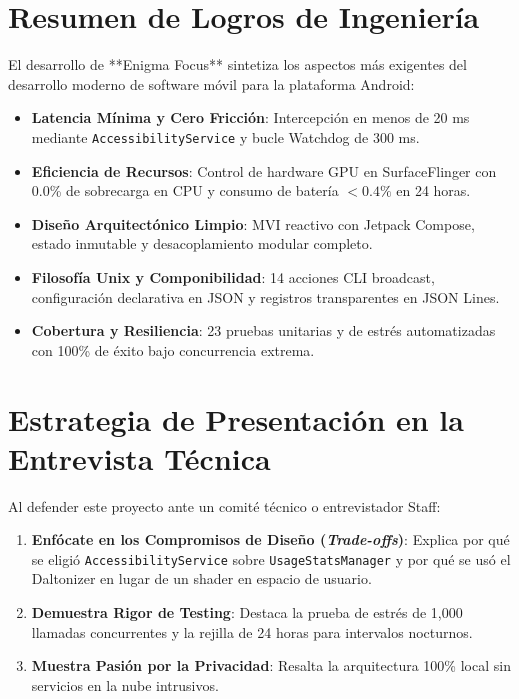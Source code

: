 \documentclass[11pt,a4paper,oneside]{report}
\begin{document}
\section{Resumen de Logros de Ingeniería}
El desarrollo de **Enigma Focus** sintetiza los aspectos más exigentes del desarrollo moderno de software móvil para la plataforma Android:
\begin{itemize}
    \item \textbf{Latencia Mínima y Cero Fricción}: Intercepción en menos de 20 ms mediante \texttt{AccessibilityService} y bucle Watchdog de 300 ms.
    \item \textbf{Eficiencia de Recursos}: Control de hardware GPU en SurfaceFlinger con 0.0\% de sobrecarga en CPU y consumo de batería $<0.4\%$ en 24 horas.
    \item \textbf{Diseño Arquitectónico Limpio}: MVI reactivo con Jetpack Compose, estado inmutable y desacoplamiento modular completo.
    \item \textbf{Filosofía Unix y Componibilidad}: 14 acciones CLI broadcast, configuración declarativa en JSON y registros transparentes en JSON Lines.
    \item \textbf{Cobertura y Resiliencia}: 23 pruebas unitarias y de estrés automatizadas con 100\% de éxito bajo concurrencia extrema.
\end{itemize}

\section{Estrategia de Presentación en la Entrevista Técnica}
Al defender este proyecto ante un comité técnico o entrevistador Staff:
\begin{enumerate}
    \item \textbf{Enfócate en los Compromisos de Diseño (\textit{Trade-offs})}: Explica por qué se eligió \texttt{AccessibilityService} sobre \texttt{UsageStatsManager} y por qué se usó el Daltonizer en lugar de un shader en espacio de usuario.
    \item \textbf{Demuestra Rigor de Testing}: Destaca la prueba de estrés de 1,000 llamadas concurrentes y la rejilla de 24 horas para intervalos nocturnos.
    \item \textbf{Muestra Pasión por la Privacidad}: Resalta la arquitectura 100\% local sin servicios en la nube intrusivos.
\end{enumerate}
\end{document}
